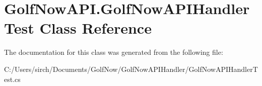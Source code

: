 \hypertarget{class_golf_now_a_p_i_1_1_golf_now_a_p_i_handler_test}{}\section{Golf\+Now\+A\+P\+I.\+Golf\+Now\+A\+P\+I\+Handler\+Test Class Reference}
\label{class_golf_now_a_p_i_1_1_golf_now_a_p_i_handler_test}


The documentation for this class was generated from the following file\+:\begin{DoxyCompactItemize}
\item 
C\+:/\+Users/sirch/\+Documents/\+Golf\+Now/\+Golf\+Now\+A\+P\+I\+Handler/Golf\+Now\+A\+P\+I\+Handler\+Test.\+cs\end{DoxyCompactItemize}
